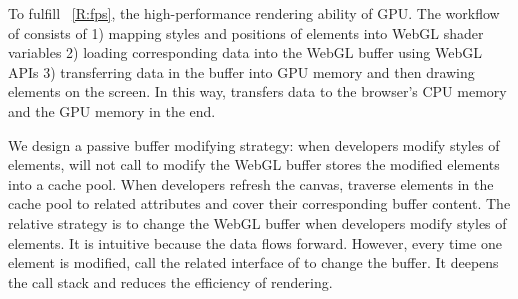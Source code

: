 
To fulfill ~\ref{R:fps},  \RenEng {} the high-performance rendering ability of GPU.
The workflow of  \RenEng consists of 1) mapping styles and positions of elements into WebGL shader variables\replaced[id=kg]{,}{;} 2) loading corresponding data into the WebGL buffer using WebGL APIs 3) transferring data in the buffer into  GPU memory and then drawing elements on the screen.
In this way,  \RenEng transfers data to the browser's CPU memory and the GPU memory in the end.


    We design a passive buffer modifying strategy: when developers modify styles of elements,  \GraModMan will not call  \RenEng to modify the WebGL buffer  stores the modified elements into a cache pool. When developers  refresh the canvas,  \RenEng {} traverse elements in the cache pool to  related attributes and cover their corresponding buffer content.
    The relative strategy is to  change the WebGL buffer  when developers modify  styles of elements. It is intuitive because the data flows forward. However, every time one element is modified,  \GraModMan {} call the related interface of  \RenEng to change the buffer. It deepens the call stack and reduces the efficiency of rendering.

